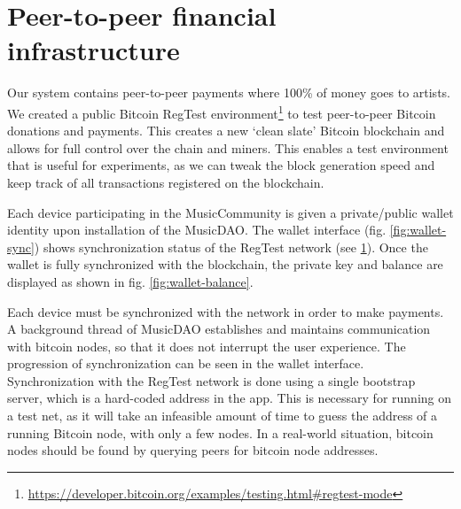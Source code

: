 \section{Peer-to-peer financial infrastructure}
\label{sec:regtest-network-impl}
Our system contains peer-to-peer payments where 100\% of money goes to artists. We created a public Bitcoin RegTest environment\footnote{\url{https://developer.bitcoin.org/examples/testing.html\#regtest-mode}} to test peer-to-peer Bitcoin donations and payments. This creates a new `clean slate' Bitcoin blockchain and allows for full control over the chain and miners. This enables a test environment that is useful for experiments, as we can tweak the block generation speed and keep track of all transactions registered on the blockchain.

Each device participating in the MusicCommunity is given a private/public wallet identity upon installation of the MusicDAO. The wallet interface (fig. \ref{fig:wallet-sync}) shows synchronization status of the RegTest network (see \ref{sec:regtest-network-impl}). Once the wallet is fully synchronized with the blockchain, the private key and balance are displayed as shown in fig. \ref{fig:wallet-balance}. 

Each device must be synchronized with the network in order to make payments. A background thread of MusicDAO establishes and maintains communication with bitcoin nodes, so that it does not interrupt the user experience. The progression of synchronization can be seen in the wallet interface. Synchronization with the RegTest network is done using a single bootstrap server, which is a hard-coded address in the app. This is necessary for running on a test net, as it will take an infeasible amount of time to guess the address of a running Bitcoin node, with only a few nodes. In a real-world situation, bitcoin nodes should be found by querying peers for bitcoin node addresses.

